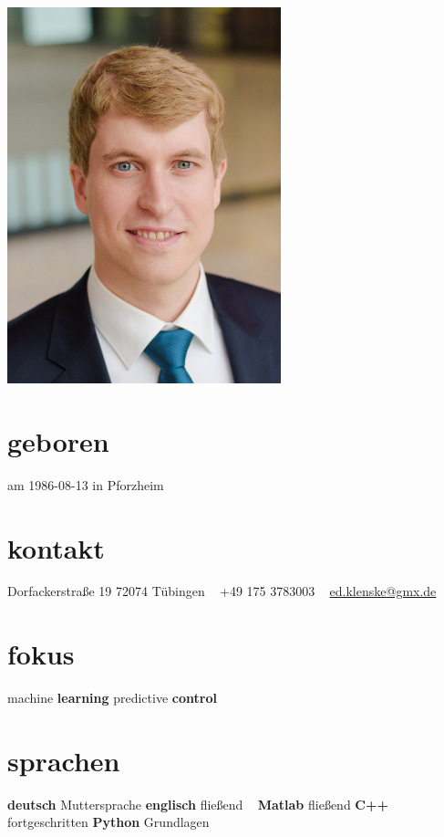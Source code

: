 \documentclass[a4paper]{k-cv} %
\begin{document}


\begin{aside} %
\includegraphics{Bewerbungsphoto_Edgar_300}
\section{geboren}
\color{gray}%
am 1986-08-13
in Pforzheim
\section{kontakt}
\color{gray}Dorfackerstra{\ss}e 19
72074 T\"ubingen
~
+49 175 3783003
~
\href{mailto:ed.klenske@gmx.de}{ed.klenske@gmx.de}
\section{fokus}
machine {\bfseries learning}
predictive {\bfseries control}
\section{sprachen}
{\bfseries deutsch} Muttersprache
{\bfseries englisch} fließend
~
{\bfseries Matlab} fließend 
{\bfseries C++} fortgeschritten
{\bfseries Python} Grundlagen
\end{aside}
\end{document}

